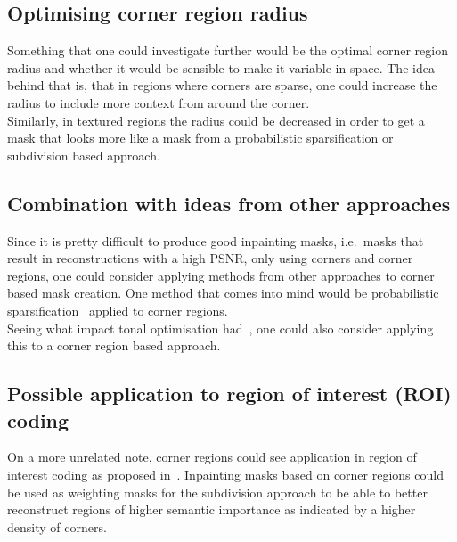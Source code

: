 \subsection*{Optimising corner region radius}

Something that one could investigate further would be the optimal corner region radius and whether
it would be sensible to make it variable in space. The idea behind that is, that in regions where
corners are sparse, one could increase the radius to include more context from around the corner.\\
Similarly, in textured regions the radius could be decreased in order to get a mask that looks more
like a mask from a probabilistic sparsification or subdivision based approach.

\subsection*{Combination with ideas from other approaches}

Since it is pretty difficult to produce good inpainting masks, i.e.\ masks that result in
reconstructions with a high PSNR, only using corners and corner regions, one could consider
applying methods from other approaches to corner based mask creation. One method that comes into
mind would be probabilistic sparsification~\cite{schmaltz14, hoeltgen12} applied to corner regions.\\
Seeing what impact tonal optimisation had~\cite{schmaltz14, hoeltgen12}, one could also consider
applying this to a corner region based approach.

\subsection*{Possible application to region of interest (ROI) coding}

On a more unrelated note, corner regions could see application in region of interest coding as
proposed in~\cite{peter15}. Inpainting masks based on corner regions could be used as weighting
masks for the subdivision approach to be able to better reconstruct regions of higher semantic
importance as indicated by a higher density of corners.
